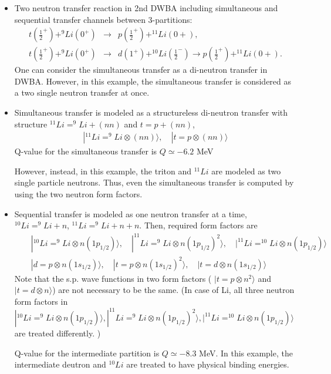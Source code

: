 \documentclass[11pt]{book}
\def\ra{\rangle}
\newcommand{\bea}{\begin{eqnarray}}
\newcommand{\eea}{\end{eqnarray}}
\newcommand{\no}{\nonumber \\}
\begin{document}
\begin{itemize}
\item Two neutron transfer reaction in 2nd DWBA
      including simultaneous and sequential transfer channels between 3-partitions:
      \bea 
      t(\frac{1}{2}^+)+^9Li(0^+) &\to& p(\frac{1}{2}^+)+^{11}Li(0+) ,\no 
      t(\frac{1}{2}^+)+^9Li(0^+)&\to& d(1^+)+^{10}Li(\frac{1}{2}^-) \to p(\frac{1}{2}^+)+^{11}Li(0+).  
      \eea 
      One can consider the simultaneous transfer as a di-neutron transfer in DWBA.
      However, in this example, the simultaneous transfer is considered as a
      two single neutron transfer at once. 
      
\item Simultaneous transfer is modeled as a structureless di-neutron transfer 
      with structure $^{11}Li=^9Li+(nn)$ and $t=p+(nn)$, 
      \bea 
      |^{11}Li=^9Li\otimes(nn)\ra, \quad |t=p\otimes(nn)\ra 
      \eea 
      Q-value for the simultaneous transfer is $Q\simeq -6.2$ MeV
      
      However, instead, in this example, the triton and $^{11}Li$ are modeled as
      two single particle neutrons. Thus, even the simultaneous transfer is 
      computed by using the two neutron form factors. 
      
\item Sequential transfer is modeled as one neutron transfer at a time,
      $^{10}Li=^9Li+n$, $^{11}Li=^9 Li+n+n$. 
      Then, required form factors are 
      \bea 
      & &|^{10}Li=^{9}Li\otimes n(1p_{1/2})\ra, \quad |^{11}Li=^9Li\otimes n(1p_{1/2})^2\ra, \quad 
         |^{11}Li=^{10}Li\otimes n(1p_{1/2})\ra 
      \no 
      & &|d=p\otimes n(1s_{1/2})\ra, \quad |t=p\otimes n(1s_{1/2})^2\ra, \quad |t=d\otimes n(1s_{1/2})\ra 
      \eea 
      Note that the s.p. wave functions in two form factors
      ( $|t=p\otimes n^2\ra$ and $|t=d\otimes n\ra $) are not necessary to be the same. 
      (In case of Li, all three neutron form factors in 
      $|^{10}Li=^{9}Li\otimes n(1p_{1/2})\ra, |^{11}Li=^9Li\otimes n(1p_{1/2})^2\ra, 
               |^{11}Li=^{10}Li\otimes n(1p_{1/2})\ra$ 
               are treated differently. )
               
      Q-value for the intermediate partition is $Q\simeq -8.3$ MeV.
      In this example, the intermediate deutron and $^{10}Li$ are treated to 
            have physical binding energies.  

      
\end{itemize}      
\end{document}
